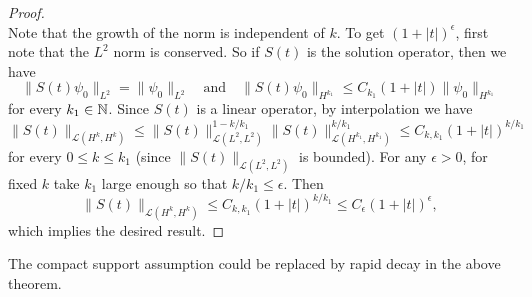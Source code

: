 \begin{proof}
\[  \]
  Note that the growth of the norm is independent of
  $k$.
  To get $(1 + |t|)^\epsilon$, first note that the
  $L^2$ norm is conserved.
  So if $S(t)$ is the solution operator, then we have
  \[
    \|S(t) \psi_0\|_{L^2} = \|\psi_0\|_{L^2}
    \quad \text{and} \quad
    \|S(t) \psi_0\|_{H^{k_1}} \le C_{k_1} (1 + |t|) \|\psi_0\|_{H^{k_1}}
  \]
  for every $k_1 \in \mathbb{N}$.  Since $S(t)$ is a linear operator,
  by interpolation we have
  \[
    \|S(t)\|_{\mathcal{L}(H^k, H^k)} \le \|S(t)\|_{\mathcal{L}(L^2, L^2)}^{1 - k / k_1} \|S(t)\|_{\mathcal{L}(H^{k_1}, H^{k_1})}^{k / k_1}
    \le C_{k, k_1} (1 + |t|)^{k / k_1}
  \]
  for every $0 \le k \le k_1$ (since
  $\|S(t)\|_{\mathcal{L}(L^2, L^2)}$ is bounded). For any
  $\epsilon > 0$,
  for fixed $k$ take $k_1$ large enough so that
  $k / k_1 \le \epsilon$. Then
  \[
    \|S(t)\|_{\mathcal{L}(H^k, H^k)}
    \le C_{k, k_1} (1 + |t|)^{k / k_1}
    \le C_{\epsilon} (1 + |t|)^\epsilon,
  \]
  which implies the desired result.
\end{proof}

\begin{remark}
  The compact support assumption could be replaced
  by rapid decay in the above theorem.
\end{remark}
